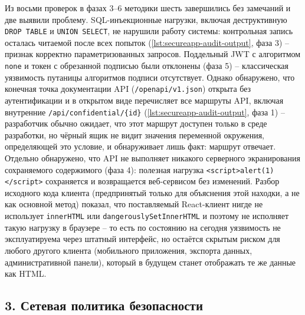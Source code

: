 Из восьми проверок в фазах 3--6 методики шесть завершились без замечаний
и две выявили проблему. SQL-инъекционные нагрузки, включая деструктивную
\texttt{DROP TABLE} и \texttt{UNION SELECT}, не нарушили работу системы:
контрольная запись осталась читаемой после всех попыток
(\autoref{lst:secureapp-audit-output}, фаза 3) -- признак корректно
параметризованных запросов. Поддельный JWT с алгоритмом \texttt{none} и
токен с обрезанной подписью были отклонены (фаза 5) -- классическая
уязвимость путаницы алгоритмов подписи отсутствует. Однако обнаружено,
что конечная точка документации API (\texttt{/openapi/v1.json}) открыта
без аутентификации и в открытом виде перечисляет все маршруты API,
включая внутренние \texttt{/api/confidential/\{id\}}
(\autoref{lst:secureapp-audit-output}, фаза 1) -- разработчик обычно
ожидает, что этот маршрут доступен только в среде разработки, но чёрный
ящик не видит значения переменной окружения, определяющей это условие, и
обнаруживает лишь факт: маршрут отвечает. Отдельно обнаружено, что API
не выполняет никакого серверного экранирования сохраняемого содержимого
(фаза 4): полезная нагрузка \texttt{<script>alert(1)</script>} сохраняется
и возвращается веб-сервисом без изменений. Разбор исходного кода клиента
(предпринятый только для объяснения этой находки, а не как основной
метод) показал, что поставляемый React-клиент нигде не использует
\texttt{innerHTML} или \texttt{dangerouslySetInnerHTML} и поэтому не
исполняет такую нагрузку в браузере -- то есть по состоянию на сегодня
уязвимость не эксплуатируема через штатный интерфейс, но остаётся
скрытым риском для любого другого клиента (мобильного приложения,
экспорта данных, административной панели), который в будущем станет
отображать те же данные как HTML.

\subsection*{3. Сетевая политика безопасности}

